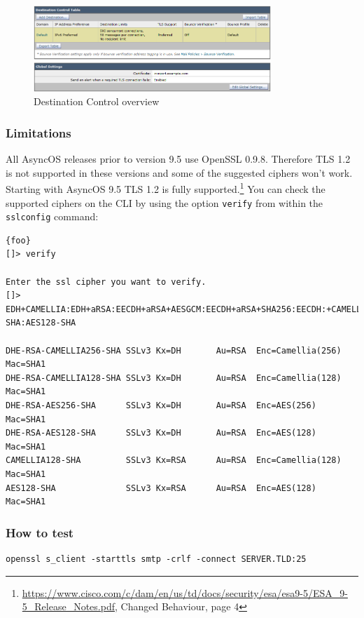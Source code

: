 \begin{figure}[p]
  \centering
  \includegraphics[width=0.8\textwidth]{img/ach_ironport_dest_control.png}
  \caption{Destination Control overview}
  \label{fig:ach_ironport_dest_control}
\end{figure}

\subsubsection{Limitations}
All AsyncOS releases prior to version 9.5 use OpenSSL 0.9.8. Therefore TLS 1.2 is not supported in these versions and some of the suggested ciphers won't work. Starting with AsyncOS 9.5 TLS 1.2 is fully supported.\footnote{\url{https://www.cisco.com/c/dam/en/us/td/docs/security/esa/esa9-5/ESA_9-5_Release_Notes.pdf}, Changed Behaviour, page 4} You can check the supported ciphers on the CLI by using the option \texttt{verify} from within the \texttt{sslconfig} command:
\begin{lstlisting}{foo}
[]> verify

Enter the ssl cipher you want to verify.
[]> EDH+CAMELLIA:EDH+aRSA:EECDH+aRSA+AESGCM:EECDH+aRSA+SHA256:EECDH:+CAMELLIA128:+AES128:+SSLv3:!aNULL:!eNULL:!LOW:!3DES:!MD5:!EXP:!PSK:!DSS:!RC4:!SEED:!IDEA:!ECDSA:kEDH:CAMELLIA128-SHA:AES128-SHA

DHE-RSA-CAMELLIA256-SHA SSLv3 Kx=DH       Au=RSA  Enc=Camellia(256) Mac=SHA1
DHE-RSA-CAMELLIA128-SHA SSLv3 Kx=DH       Au=RSA  Enc=Camellia(128) Mac=SHA1
DHE-RSA-AES256-SHA      SSLv3 Kx=DH       Au=RSA  Enc=AES(256)  Mac=SHA1
DHE-RSA-AES128-SHA      SSLv3 Kx=DH       Au=RSA  Enc=AES(128)  Mac=SHA1
CAMELLIA128-SHA         SSLv3 Kx=RSA      Au=RSA  Enc=Camellia(128) Mac=SHA1
AES128-SHA              SSLv3 Kx=RSA      Au=RSA  Enc=AES(128)  Mac=SHA1
\end{lstlisting}

\subsubsection{How to test}
\begin{lstlisting}
openssl s_client -starttls smtp -crlf -connect SERVER.TLD:25
\end{lstlisting}

\FloatBarrier %
